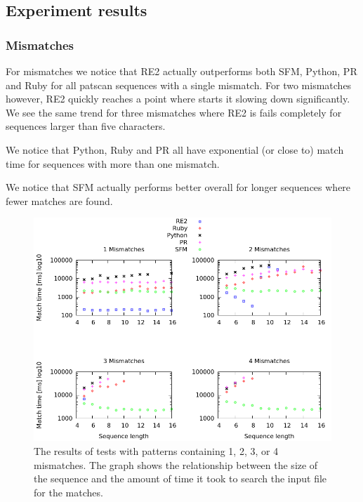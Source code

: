 \documentclass[12pt]{article}
\theoremstyle{definition}
\begin{document}
\subsection{Experiment results}

\subsubsection{Mismatches}

For mismatches we notice that RE2 actually outperforms both SFM, Python, PR and Ruby for all patscan sequences with a single mismatch. For two mismatches however, RE2 quickly reaches a point where starts it slowing down significantly. We see the same trend for three mismatches where RE2 is fails completely for sequences larger than five characters.

We notice that Python, Ruby and PR all have exponential (or close to) match time for sequences with more than one mismatch. 

We notice that SFM actually performs better overall for longer sequences where fewer matches are found.

\begin{figure}[H]
	\begin{center}
		\includegraphics[scale=0.55]{graphs/mismatches.png}	
	\end{center}
	\caption{The results of tests with patterns containing 1, 2, 3, or 4 mismatches. The graph shows the relationship between the size of the sequence and the amount of time it took to search the input file for the matches.}
	\label{graph:cases:mismatches}
\end{figure}
\end{document}
